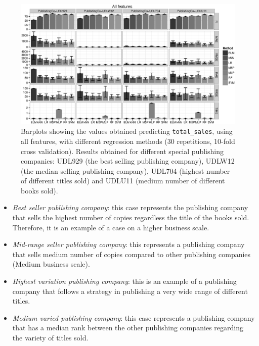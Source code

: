 \documentclass[a4paper,10pt,twocolumn,preprint,3p]{elsarticle}
\begin{document}
\begin{figure}[ht]
\begin{center}
\includegraphics[scale=0.58]{./imgs/attribute_All.eps}
\end{center}
\caption{Barplots showing the values obtained predicting
  \texttt{total\_sales}, using all features, with different regression
  methods (30 repetitions, 10-fold cross validation). Results obtained
  for different special publishing companies: UDL929 (the best selling
  publishing company), UDLW12 (the median selling publishing company),
  UDL704 (highest number of different titles sold) and UDLU11 (medium
  number of different books sold). 
}
\label{fig:attributeAll}
\end{figure}

\begin{itemize}
    \item \textit{Best seller publishing company}: this case represents the publishing company that sells the highest number of copies regardless the title of the books sold. Therefore, it is an example of a case on a higher business scale.
    \item \textit{Mid-range seller publishing company}: this represents a publishing company that sells medium number of copies compared to other publishing companies (Medium business scale). 
    \item \textit{Highest variation publishing company}: this is an example of a publishing company that follows a strategy in publishing a very wide range of different titles.
    \item \textit{Medium varied publishing company}: this case represents a publishing company that has a median rank between the other publishing companies regarding the variety of titles sold.
\end{itemize}
\end{document}
